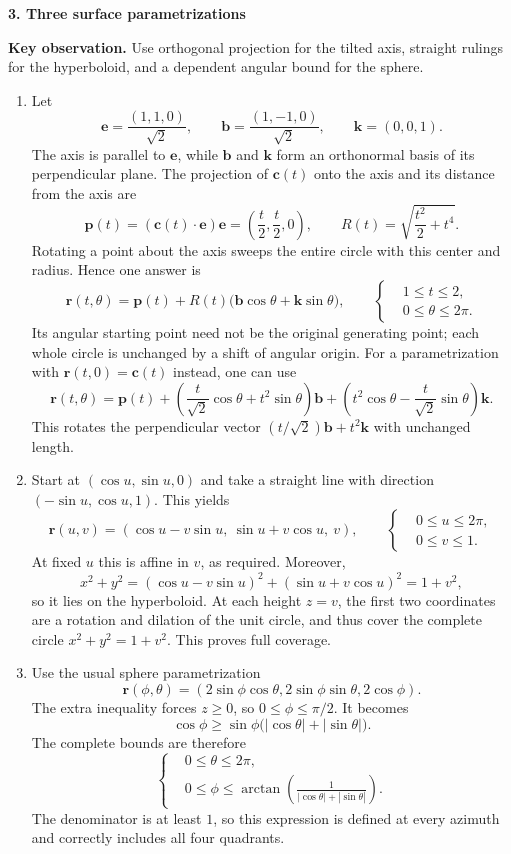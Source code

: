 \documentclass[11pt,letterpaper]{article}
\renewcommand{\vec}[1]{\mathbf{#1}}
\newcommand{\solutionproblem}[3]{%
  \par\bigskip\Needspace{7\baselineskip}
  \noindent\textbf{#1. #2}\par\nobreak
}
\newcommand{\insight}[1]{\par\textbf{Key observation.} #1\par}
\begin{document}
\solutionproblem{3}{Three surface parametrizations}{12}
\insight{Use orthogonal projection for the tilted axis, straight rulings
for the hyperboloid, and a dependent angular bound for the sphere.}
\begin{enumerate}[label=(\alph*)]
\item Let
\[
\vec e=\frac{(1,1,0)}{\sqrt2},\qquad
\vec b=\frac{(1,-1,0)}{\sqrt2},\qquad \vec k=(0,0,1).
\]
The axis is parallel to $\vec e$, while $\vec b$ and $\vec k$ form
an orthonormal basis of its perpendicular plane. The projection of
$\vec c(t)$ onto the axis and its distance from the axis are
\[
\vec p(t)=(\vec c(t)\cdot\vec e)\vec e
=\left(\frac t2,\frac t2,0\right),\qquad
R(t)=\sqrt{\frac{t^2}{2}+t^4}.
\]
Rotating a point about the axis sweeps the entire circle with this center
and radius. Hence one answer is
\[
\boxed{\vec r(t,\theta)=\vec p(t)+R(t)
\bigl(\vec b\cos\theta+\vec k\sin\theta\bigr)},\qquad
\left\{\begin{aligned}
&1\le t\le2,\\
&0\le\theta\le2\pi.
\end{aligned}\right.
\]
Its angular starting point need not be the original generating point;
each whole circle is unchanged by a shift of angular origin. For a
parametrization with $\vec r(t,0)=\vec c(t)$ instead, one can use
\[
\vec r(t,\theta)=\vec p(t)
+\left(\frac t{\sqrt2}\cos\theta+t^2\sin\theta\right)\vec b
+\left(t^2\cos\theta-\frac t{\sqrt2}\sin\theta\right)\vec k.
\]
This rotates the perpendicular vector
$(t/\sqrt2)\vec b+t^2\vec k$ with unchanged length.

\item Start at $(\cos u,\sin u,0)$ and take a straight line with
direction $(-\sin u,\cos u,1)$. This yields
\[
\boxed{\vec r(u,v)=(\cos u-v\sin u,\ \sin u+v\cos u,\ v)},
\qquad
\left\{\begin{aligned}
&0\le u\le2\pi,\\
&0\le v\le1.
\end{aligned}\right.
\]
At fixed $u$ this is affine in $v$, as required. Moreover,
\[
x^2+y^2=(\cos u-v\sin u)^2+(\sin u+v\cos u)^2=1+v^2,
\]
so it lies on the hyperboloid. At each height $z=v$, the first two
coordinates are a rotation and dilation of the unit circle, and thus
cover the complete circle $x^2+y^2=1+v^2$. This proves full coverage.

\item Use the usual sphere parametrization
\[
\boxed{\vec r(\phi,\theta)
=(2\sin\phi\cos\theta,2\sin\phi\sin\theta,2\cos\phi)}.
\]
The extra inequality forces $z\ge0$, so $0\le\phi\le\pi/2$. It becomes
\[
\cos\phi\ge\sin\phi\bigl(|\cos\theta|+|\sin\theta|\bigr).
\]
The complete bounds are therefore
\[
\boxed{\left\{\begin{aligned}
&0\le\theta\le2\pi,\\
&0\le\phi\le\arctan\!\left(
\frac1{|\cos\theta|+|\sin\theta|}\right).
\end{aligned}\right.}
\]
The denominator is at least $1$, so this expression is defined at every
azimuth and correctly includes all four quadrants.
\end{enumerate}
\end{document}
